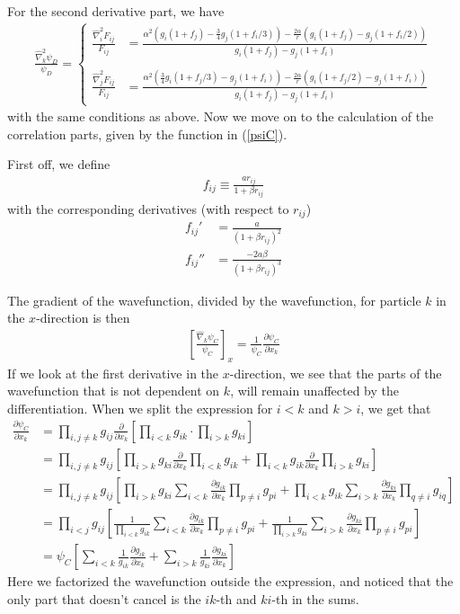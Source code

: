 \documentclass[twocolumn,12pt]{extarticle}
\newcommand{\eq}[1]{{\small\begin{align*}#1\end{align*}}}
\newcommand{\equ}[1]{{\small\begin{align}#1\end{align}}}
\newcommand{\op}[1]{\hat{#1}}
\begin{document}
For the second derivative part, we have 
\eq{
  \frac{\op\nabla_k^2 \psi_D}{\psi_D} =
  \begin{cases}
    \frac{\op\nabla_i^2 F_{ij}}{F_{ij}}
    &= \frac{\alpha^2 (g_i(1+f_j) 
      - \frac{3}{4} g_j (1+f_i/3)) - \frac{2\alpha}{r}(g_i(1+f_j) - g_j (1+f_i/2))}
      {g_i (1+f_j) - g_j (1+f_i)}\\\\
    \frac{\op\nabla_j^2 F_{ij}}{F_{ij}}
    &= \frac{\alpha^2 (\frac{3}{4}g_i(1+f_j/3) 
      - g_j (1+f_i)) - \frac{2\alpha}{r}(g_i (1+f_j/2) 
      - g_j(1+f_i))}
      {g_i (1+f_j) - g_j (1+f_i)}
  \end{cases}
}
with the same conditions as above.
Now we move on to the calculation of the correlation parts,
given by the function in (\ref{psiC}). 

First off, we define
\eq{
  f_{ij} \equiv \frac{ar_{ij}}{1+\beta r_{ij}}
}
with the corresponding derivatives (with respect to $r_{ij}$)
\eq{
  f_{ij}' &= \frac{a}{(1+\beta r_{ij})^2}\\
  f_{ij}'' &= \frac{-2a\beta}{(1+\beta r_{ij})^3}
}

The gradient of the wavefunction, 
divided by the wavefunction, for particle $k$ in the $x$-direction is then
\eq{
  \left[\frac{\op\nabla_k\psi_C}{\psi_C}\right]_x 
  =\frac{1}{\psi_C}\frac{\partial\psi_C}{\partial x_k}
}
If we look at the first derivative in the $x$-direction, 
we see that the parts of the wavefunction that is not dependent on $k$, 
will remain unaffected by the 
differentiation.
When we split the expression for $i<k$ and $k>i$, we get that
\equ{
  \frac{\partial\psi_C}{\partial x_k}&=\prod_{i,j\neq k} g_{ij}
    \frac{\partial}{\partial x_k}
    \left[ \prod_{i<k} g_{ik} \cdot \prod_{i>k} g_{ki} \right]\nonumber\\
    &=\prod_{i,j\neq k} g_{ij}
      \left[\prod_{i>k} g_{ki}\frac{\partial}{\partial x_k}\prod_{i<k} g_{ik} 
      + \prod_{i<k} g_{ik} \frac{\partial}{\partial x_k}\prod_{i>k} g_{ki} \right]
      \nonumber\\
    &=\prod_{i,j\neq k} g_{ij}
      \left[\prod_{i>k} g_{ki} \sum_{i<k} \frac{\partial g_{ik}}{\partial x_k} \prod_{p\neq i} g_{pi}
      + \prod_{i<k} g_{ik} \sum_{i>k} \frac{\partial g_{ki}}{\partial x_k} \prod_{q\neq i} g_{iq} \right]
      \nonumber\\
    &=\prod_{i<j} g_{ij}
      \left[\frac{1}{\prod_{i<k} g_{ik}} \sum_{i<k} 
      \frac{\partial g_{ik}}{\partial x_k} \prod_{p\neq i} g_{pi}
      + \frac{1}{\prod_{i>k} g_{ki}} \sum_{i>k} 
      \frac{\partial g_{ki}}{\partial x_k} \prod_{p\neq i} g_{pi} \right]
      \nonumber\\
    &=\psi_C
      \left[\sum_{i<k} \frac{1}{g_{ik}} \frac{\partial g_{ik}}{\partial x_k}
      +\sum_{i>k} \frac{1}{g_{ki}} \frac{\partial g_{ki}}{\partial x_k} \right]
      \label{DpsiC}
}
Here we factorized the wavefunction outside the expression, 
and noticed that the only part that doesn't cancel is the $ik$-th and $ki$-th
in the sums.
\end{document}
